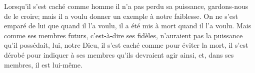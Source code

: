 Lorsqu’il s’est caché comme homme il n’a pas perdu sa puissance,
		gardons-nous de le croire;
	mais il a voulu donner un exemple à notre faiblesse.
On ne s’est emparé de lui que quand il l’a voulu,
	il a été mis à mort quand il l’a voulu.
Mais comme ses membres futurs, c’est-à-dire ses fidèles,
	n’auraient pas la puissance qu’il possédait, lui, notre Dieu,
	il s’est caché comme pour éviter la mort,
	il s’est dérobé pour indiquer à ses membres qu’ils devraient agir ainsi,
	et, dans ses membres, il est lui-même.
